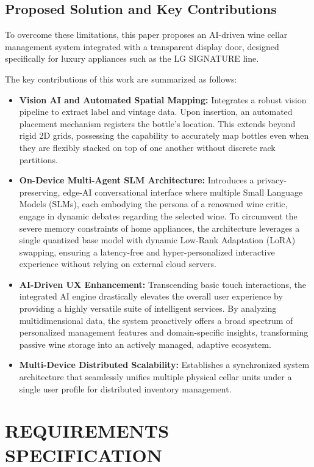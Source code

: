 \documentclass[conference]{IEEEtran}
\begin{document}
\subsection{Proposed Solution and Key Contributions}
To overcome these limitations, this paper proposes an AI-driven wine cellar management system integrated with a transparent display door, designed specifically for luxury appliances such as the LG SIGNATURE line.

The key contributions of this work are summarized as follows:
\begin{itemize}
    \item \textbf{Vision AI and Automated Spatial Mapping:} Integrates a robust vision pipeline to extract label and vintage data. Upon insertion, an automated placement mechanism registers the bottle's location. This extends beyond rigid 2D grids, possessing the capability to accurately map bottles even when they are flexibly stacked on top of one another without discrete rack partitions.
    \item \textbf{On-Device Multi-Agent SLM Architecture:} Introduces a privacy-preserving, edge-AI conversational interface where multiple Small Language Models (SLMs), each embodying the persona of a renowned wine critic, engage in dynamic debates regarding the selected wine. To circumvent the severe memory constraints of home appliances, the architecture leverages a single quantized base model with dynamic Low-Rank Adaptation (LoRA) swapping, ensuring a latency-free and hyper-personalized interactive experience without relying on external cloud servers.
    \item \textbf{AI-Driven UX Enhancement:} Transcending basic touch interactions, the integrated AI engine drastically elevates the overall user experience by providing a highly versatile suite of intelligent services. By analyzing multidimensional data, the system proactively offers a broad spectrum of personalized management features and domain-specific insights, transforming passive wine storage into an actively managed, adaptive ecosystem.
    \item \textbf{Multi-Device Distributed Scalability:} Establishes a synchronized system architecture that seamlessly unifies multiple physical cellar units under a single user profile for distributed inventory management.
\end{itemize}

\section{REQUIREMENTS SPECIFICATION}
\end{document}

